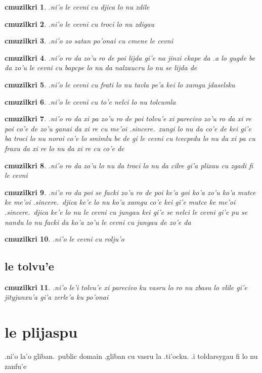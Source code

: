 \documentclass{report}
\newtheorem{cmuzilkri}{cmuzilkri}
\begin{document}
\begin{cmuzilkri}
        .ni'o le cevni cu djica lo nu zdile
\end{cmuzilkri}
\begin{cmuzilkri}
        .ni'o le cevni cu troci lo nu zdigau
\end{cmuzilkri}
\begin{cmuzilkri}
        .ni'o zo satan po'onai cu cmene le cevni
\end{cmuzilkri}
\begin{cmuzilkri}
        .ni'o ro da zo'u ro de poi lijda gi'e na jinzi ckape da .a lo gugde be da zo'u le cevni cu bapcpe lo nu da nalzaucru lo nu se lijda de
\end{cmuzilkri}
\begin{cmuzilkri}
        .ni'o le cevni cu frati lo nu tavla pe'a kei lo xamgu jdaselsku
\end{cmuzilkri}
\begin{cmuzilkri}
        .ni'o le cevni cu to'e nelci lo nu tolcumla
\end{cmuzilkri}
\begin{cmuzilkri}
        .ni'o ro da xi pa zo'u ro de poi tolvu'e xi parecivo zo'u ro da xi re poi co'e de zo'u ganai da xi re cu me'oi .sincere.\ zungi lo nu da co'e de kei gi'e ba troci lo nu noroi co'e lo smimlu be de gi le cevni cu tcecpedu lo nu da xi pa cu fraxu da xi re lo nu da xi re cu co'e de
\end{cmuzilkri}
\begin{cmuzilkri}
        .ni'o ro da zo'u lo nu da troci lo nu da cilre gi'a plixau cu zgadi fi le cevni
\end{cmuzilkri}
\begin{cmuzilkri}
        .ni'o ro da poi se facki zo'u ro de poi ke'a goi ko'a zo'u ko'a mutce ke me'oi .sincere.\ djica ke'e lo nu ko'a xamgu co'e kei gi'e mutce ke me'oi .sincere.\ djica ke'e lo nu le cevni cu jungau kei gi'e se nelci le cevni gi'e pu se nandu lo nu facki da ko'a zo'u le cevni cu jungau de zo'e da
\end{cmuzilkri}
\begin{cmuzilkri}
	.ni'o le cevni cu rolju'o
\end{cmuzilkri}

\section{le tolvu'e}
\begin{cmuzilkri}
        .ni'o le'i tolvu'e xi parecivo ku vasru lo ro nu zbasu lo vlile gi'e jityjunxu'a gi'a zerle'a ku po'onai
\end{cmuzilkri}

\chapter{le plijaspu}
.ni'o la'o gliban.\ public domain .gliban cu vasru la .ti'ocku.  .i toldarsygau fi lo nu zanfu'e
\end{document}

